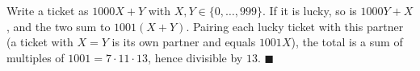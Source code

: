 Write a ticket as $1000X+Y$ with $X,Y\in\{0,\dots,999\}$. If it is lucky, so is $1000Y+X$, and the two sum to $1001(X+Y)$. Pairing each lucky ticket with this partner (a ticket with $X=Y$ is its own partner and equals $1001X$), the total is a sum of multiples of $1001=7\cdot11\cdot13$, hence divisible by $13$. $\blacksquare$
